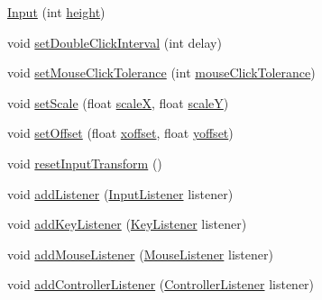 \begin{DoxyCompactItemize}
\item 
\mbox{\hyperlink{classorg_1_1newdawn_1_1slick_1_1_input_a3ca3a9486b30fbe69a900c75d3a47c4d}{Input}} (int \mbox{\hyperlink{classorg_1_1newdawn_1_1slick_1_1_input_a7d805ec6ad6944a4c48189e8435c3589}{height}})
\item 
void \mbox{\hyperlink{classorg_1_1newdawn_1_1slick_1_1_input_aee3b72f3ddced0779f193c783adb6f66}{set\+Double\+Click\+Interval}} (int delay)
\item 
void \mbox{\hyperlink{classorg_1_1newdawn_1_1slick_1_1_input_a0fca68dcdaabaa2e7fe8213df68b913a}{set\+Mouse\+Click\+Tolerance}} (int \mbox{\hyperlink{classorg_1_1newdawn_1_1slick_1_1_input_a8a57b217ce798c9495cefe02853ad65a}{mouse\+Click\+Tolerance}})
\item 
void \mbox{\hyperlink{classorg_1_1newdawn_1_1slick_1_1_input_a123f4ac6d8666b016ce0e8425b998357}{set\+Scale}} (float \mbox{\hyperlink{classorg_1_1newdawn_1_1slick_1_1_input_ad007c0ee133e9e1ca57f2ae95c7df166}{scaleX}}, float \mbox{\hyperlink{classorg_1_1newdawn_1_1slick_1_1_input_a1a1f2fde64f0947353a3b1c2ea09d42c}{scaleY}})
\item 
void \mbox{\hyperlink{classorg_1_1newdawn_1_1slick_1_1_input_af618e44ab698b596f7b56e6bda4457eb}{set\+Offset}} (float \mbox{\hyperlink{classorg_1_1newdawn_1_1slick_1_1_input_a51d996d444321f25398b39993bbe9dd2}{xoffset}}, float \mbox{\hyperlink{classorg_1_1newdawn_1_1slick_1_1_input_a83f7e89a50859707a59db3464a2d98a8}{yoffset}})
\item 
void \mbox{\hyperlink{classorg_1_1newdawn_1_1slick_1_1_input_a9e904f004c40cec0088f90f24fa09762}{reset\+Input\+Transform}} ()
\item 
void \mbox{\hyperlink{classorg_1_1newdawn_1_1slick_1_1_input_a281147c97d575c9a5a69004f31fcd596}{add\+Listener}} (\mbox{\hyperlink{interfaceorg_1_1newdawn_1_1slick_1_1_input_listener}{Input\+Listener}} listener)
\item 
void \mbox{\hyperlink{classorg_1_1newdawn_1_1slick_1_1_input_af5ad91bb375e8834e1914f441794561b}{add\+Key\+Listener}} (\mbox{\hyperlink{interfaceorg_1_1newdawn_1_1slick_1_1_key_listener}{Key\+Listener}} listener)
\item 
void \mbox{\hyperlink{classorg_1_1newdawn_1_1slick_1_1_input_afada327c45b45cfbf2b3eb5ad00a39aa}{add\+Mouse\+Listener}} (\mbox{\hyperlink{interfaceorg_1_1newdawn_1_1slick_1_1_mouse_listener}{Mouse\+Listener}} listener)
\item 
void \mbox{\hyperlink{classorg_1_1newdawn_1_1slick_1_1_input_a365351842cce1e87223149ad5089c4c1}{add\+Controller\+Listener}} (\mbox{\hyperlink{interfaceorg_1_1newdawn_1_1slick_1_1_controller_listener}{Controller\+Listener}} listener)

\end{DoxyCompactItemize}
